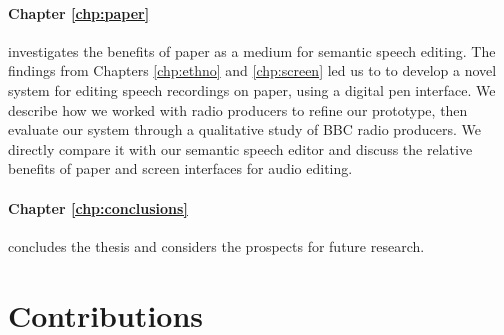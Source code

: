 \paragraph{Chapter \ref{chp:paper}} investigates the benefits of paper as a medium for semantic speech editing.  The
findings from Chapters \ref{chp:ethno} and \ref{chp:screen} led us to to develop a novel system for editing speech
recordings on paper, using a digital pen interface. We describe how we worked with radio producers to refine our
prototype, then evaluate our system through a qualitative study of BBC radio producers. We directly compare it with our
semantic speech editor and discuss the relative benefits of paper and screen interfaces for audio editing.

\paragraph{Chapter \ref{chp:conclusions}} concludes the thesis and considers the prospects for future research.

\section{Contributions}\label{sec:intro-contributions}






